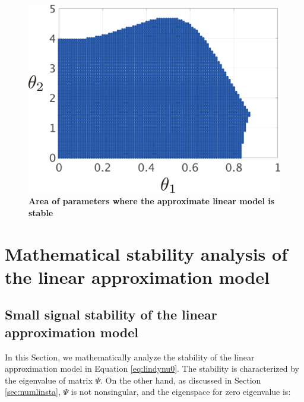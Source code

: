 \documentclass[tombow,dvipdfmx]{corona-a5-1.1}
\begin{document}
\begin{figure}[t!]
{\begin{minipage}{0.49\linewidth}
    \medskip
  \end{minipage}
  \begin{minipage}{0.49\linewidth}
    \centering
    \includegraphics[width = 0.90\linewidth]{figs/Y0.01D0.01}
    \medskip
  \end{minipage}
}
 \caption{\textbf{Area of parameters where the approximate linear model is stable}}
 \label{fig:stacheck}
\medskip
\end{figure}


\section{Mathematical stability analysis of the linear approximation model\advanced}\label{sec:linmathana}

\subsection{Small signal stability of the linear approximation model\advanced}
In this Section, we mathematically analyze the stability of the linear approximation model in Equation \ref{eq:lindynu0}.
The stability is characterized by the eigenvalue of matrix $\Psi$.
On the other hand, as discussed in Section \ref{sec:numlinsta}, $\Psi$ is not nonsingular, and the eigenspace for zero eigenvalue is:
\end{document}
